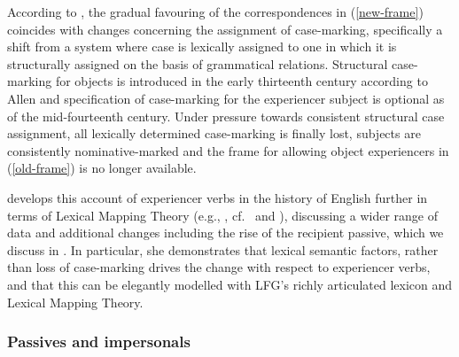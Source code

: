 \documentclass[output=paper,hidelinks]{langscibook}
\begin{document}
According to \citet{allen1986}, the gradual favouring of the correspondences in (\ref{new-frame}) coincides with changes concerning the assignment of case-marking, specifically a shift from a system where case is lexically assigned to one in which it is structurally assigned on the basis of grammatical relations. Structural case-marking for objects is introduced in the early thirteenth century according to Allen and  specification of case-marking for the experiencer subject is optional as of the mid-fourteenth century. Under pressure towards consistent structural case assignment, all lexically determined case-marking is finally lost, subjects are consistently nominative-marked and the frame for allowing object experiencers in (\ref{old-frame}) is no longer available.





\citet{allen1995case} develops this account of experiencer verbs in the history of English further  in terms of Lexical Mapping Theory (e.g., \citealp{bresnan1989locative}, cf.~ and ), discussing a wider range of data and additional changes including the rise of the recipient passive, which we discuss in . In particular, she demonstrates that lexical semantic factors, rather than loss of case-marking drives the change with respect to experiencer verbs, and that this can be elegantly modelled with LFG's richly articulated lexicon and Lexical Mapping Theory.


\subsubsection{Passives and impersonals}
\end{document}
